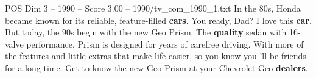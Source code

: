 \begin{textsample}{POS Dim 3 – 1990 – Score 3.00 – 1990/tv\_com\_1990\_1.txt}  \label{ex:f3_pos_072}
In the 80s, Honda became known for its reliable, feature-filled \textbf{cars}.
You ready, Dad?
I love this \textbf{car}.
But today, the 90s begin with the new Geo Prism.
The \textbf{quality} sedan with 16-valve performance, Prism is designed for years of carefree driving.
With more of the features and little extras that make life easier, so you know you 'll be friends for a long time.
Get to know the new Geo Prism at your Chevrolet Geo \textbf{dealers}.

\end{textsample}
